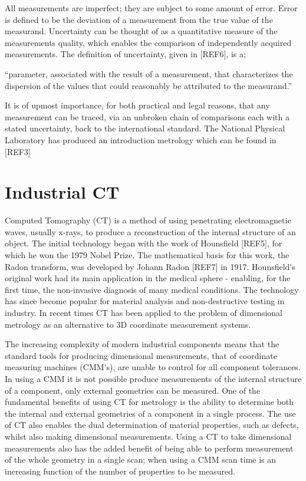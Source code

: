 \documentclass[
  twoside,
  11pt, a4paper,
  footinclude=true,
  headinclude=true,
  cleardoublepage=empty
]{scrbook}
\begin{document}
All measurements are imperfect; they are subject to some amount of error. Error is defined to be the deviation of a measurement from the true value of the measurand. Uncertainty can be thought of as a quantitative measure of the measurements quality, which enables the comparison of independently acquired measurements. The definition of uncertainty, given in [REF6], is a;

``parameter, associated with the result of a measurement, that characterizes the dispersion of the values that could reasonably be attributed to the measurand.''

It is of upmost importance, for both practical and legal reasons, that any measurement can be traced, via an unbroken chain of comparisons each with a stated uncertainty, back to the international standard. The National Physical Laboratory has produced an introduction metrology which can be found in [REF3]

\section{Industrial CT}

Computed Tomography (CT) is a method of using penetrating electromagnetic waves, usually x-rays, to produce a reconstruction of the internal structure of an object. The initial technology began with the work of Hounsfield [REF5], for which he won the 1979 Nobel Prize. The mathematical basis for this work, the Radon transform, was developed by Johann Radon [REF7] in 1917. Hounsfield’s original work had its main application in the medical sphere - enabling, for the first time, the non-invasive diagnosis of many medical conditions. The technology has since become popular for material analysis and non-destructive testing in industry. In recent times CT has been applied to the problem of dimensional metrology as an alternative to 3D coordinate measurement systems.

The increasing complexity of modern industrial components means that the standard tools for producing dimensional measurements, that of coordinate measuring machines (CMM’s), are unable to control for all component tolerances. In using a CMM it is not possible produce measurements of the internal structure of a component, only external geometries can be measured. One of the fundamental benefits of using CT for metrology is the ability to determine both the internal and external geometries of a component in a single process. The use of CT also enables the dual determination of material properties, such as defects, whilst also making dimensional measurements. Using a CT to take dimensional measurements also has the added benefit of being able to perform measurement of the whole geometry in a single scan; when using a CMM scan time is an increasing function of the number of properties to be measured.
\end{document}
